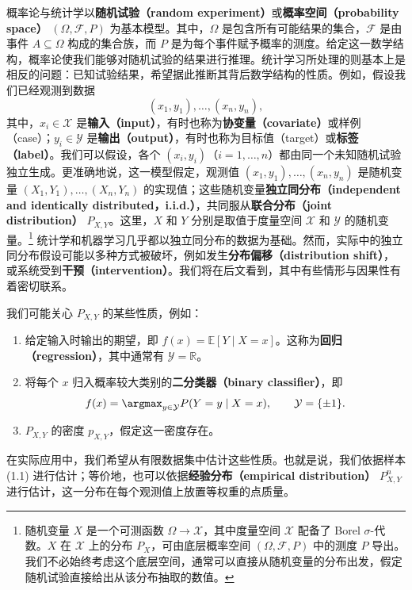 概率论与统计学以\textbf{随机试验（random experiment）}或\textbf{概率空间（probability space）} $(\Omega,\mathcal{F},P)$ 为基本模型。其中，$\Omega$ 是包含所有可能结果的集合，$\mathcal{F}$ 是由事件 $A\subseteq\Omega$ 构成的集合族，而 $P$ 是为每个事件赋予概率的测度。给定这一数学结构，概率论使我们能够对随机试验的结果进行推理。统计学习所处理的则基本上是相反的问题：已知试验结果，希望据此推断其背后数学结构的性质。例如，假设我们已经观测到数据
\begin{equation}
 (x_1,y_1),\ldots,(x_n,y_n),
 \tag{1.1}
\end{equation}
其中，$x_i\in\mathcal{X}$ 是\textbf{输入（input）}，有时也称为\textbf{协变量（covariate）}或样例（case）；$y_i\in\mathcal{Y}$ 是\textbf{输出（output）}，有时也称为目标值（target）或\textbf{标签（label）}。我们可以假设，各个 $(x_i,y_i)$（$i=1,\ldots,n$）都由同一个未知随机试验独立生成。更准确地说，这一模型假定，观测值 $(x_1,y_1),\ldots,(x_n,y_n)$ 是随机变量 $(X_1,Y_1),\ldots,(X_n,Y_n)$ 的实现值；这些随机变量\textbf{独立同分布（independent and identically distributed，i.i.d.）}，共同服从\textbf{联合分布（joint distribution）} $P_{X,Y}$。这里，$X$ 和 $Y$ 分别是取值于度量空间 $\mathcal{X}$ 和 $\mathcal{Y}$ 的随机变量。\footnote{随机变量 $X$ 是一个可测函数 $\Omega\to\mathcal{X}$，其中度量空间 $\mathcal{X}$ 配备了 Borel $\sigma$-代数。$X$ 在 $\mathcal{X}$ 上的分布 $P_X$，可由底层概率空间 $(\Omega,\mathcal{F},P)$ 中的测度 $P$ 导出。我们不必始终考虑这个底层空间，通常可以直接从随机变量的分布出发，假定随机试验直接给出从该分布抽取的数值。}
统计学和机器学习几乎都以独立同分布的数据为基础。然而，实际中的独立同分布假设可能以多种方式被破坏，例如发生\textbf{分布偏移（distribution shift）}，或系统受到\textbf{干预（intervention）}。我们将在后文看到，其中有些情形与因果性有着密切联系。

我们可能关心 $P_{X,Y}$ 的某些性质，例如：
\begin{enumerate}[label=(\roman*)]
 \item 给定输入时输出的期望，即 $f(x)=\mathbb{E}[Y\mid X=x]$。这称为\textbf{回归（regression）}，其中通常有 $\mathcal{Y}=\mathbb{R}$。
 \item 将每个 $x$ 归入概率较大类别的\textbf{二分类器（binary classifier）}，即
 \[
   f(x)=\argmax_{y\in\mathcal{Y}}P(Y=y\mid X=x),
   \qquad \mathcal{Y}=\{\pm1\}.
 \]
 \item $P_{X,Y}$ 的密度 $p_{X,Y}$，假定这一密度存在。
\end{enumerate}
在实际应用中，我们希望从有限数据集中估计这些性质。也就是说，我们依据样本 (1.1) 进行估计；等价地，也可以依据\textbf{经验分布（empirical distribution）} $P^n_{X,Y}$ 进行估计，这一分布在每个观测值上放置等权重的点质量。

